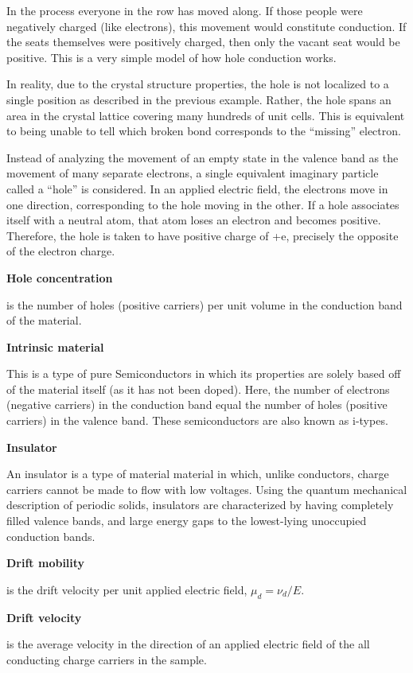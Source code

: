 \documentclass{../lab}
\begin{document}
In the process everyone in the row has moved along. If those people were negatively charged (like electrons), this movement would constitute conduction. If the seats themselves were positively charged, then only the vacant seat would be positive. This is a very simple model of how hole conduction works.

In reality, due to the crystal structure properties, the hole is not localized to a single position as described in the previous example. Rather, the hole spans an area in the crystal lattice covering many hundreds of unit cells. This is equivalent to being unable to tell which broken bond corresponds to the ``missing'' electron.

Instead of analyzing the movement of an empty state in the valence band as the movement of many separate electrons, a single equivalent imaginary particle called a ``hole'' is considered. In an applied electric field, the electrons move in one direction, corresponding to the hole moving in the other. If a hole associates itself with a neutral atom, that atom loses an electron and becomes positive. Therefore, the hole is taken to have positive charge of +e, precisely the opposite of the electron charge.

\textbf{Hole concentration}

is the number of holes (positive carriers) per unit volume in the conduction band of the material.

\textbf{Intrinsic material}

This is a type of pure Semiconductors in which its properties are solely based off of the material itself (as it has not been doped). Here, the number of electrons (negative carriers) in the conduction band equal the number of holes (positive carriers) in the valence band. These semiconductors are also known as i-types.

\textbf{Insulator}

An insulator is a type of material material in which, unlike conductors, charge carriers cannot be made to flow with low voltages. Using the quantum mechanical description of periodic solids, insulators are characterized by having completely filled valence bands, and large energy gaps to the lowest-lying unoccupied conduction bands.

\textbf{Drift mobility}

is the drift velocity per unit applied electric field, $\mu_d = \nu_d/ E$.

\textbf{Drift velocity}

is the average velocity in the direction of an applied electric field of the all conducting charge carriers in the sample.
\end{document}
